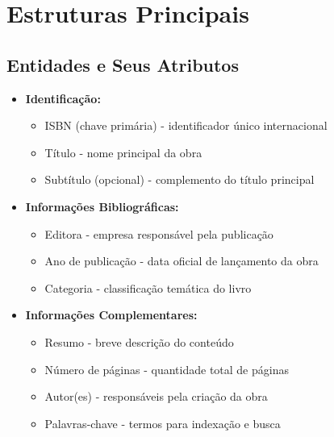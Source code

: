 \documentclass[12pt,a4paper]{article}
\begin{document}
\section{Estruturas Principais}

\subsection{Entidades e Seus Atributos}

\begin{conceptbox}[Livro]
\begin{itemize}[leftmargin=*]
    \item \textbf{Identificação:}
    \begin{itemize}
        \item ISBN (chave primária) - identificador único internacional
        \item Título - nome principal da obra
        \item Subtítulo (opcional) - complemento do título principal
    \end{itemize}
    \item \textbf{Informações Bibliográficas:}
    \begin{itemize}
        \item Editora - empresa responsável pela publicação
        \item Ano de publicação - data oficial de lançamento da obra
        \item Categoria - classificação temática do livro
    \end{itemize}
    \item \textbf{Informações Complementares:}
    \begin{itemize}
        \item Resumo - breve descrição do conteúdo
        \item Número de páginas - quantidade total de páginas
        \item Autor(es) - responsáveis pela criação da obra
        \item Palavras-chave - termos para indexação e busca
    \end{itemize}
\end{itemize}
\end{conceptbox}
\end{document}
